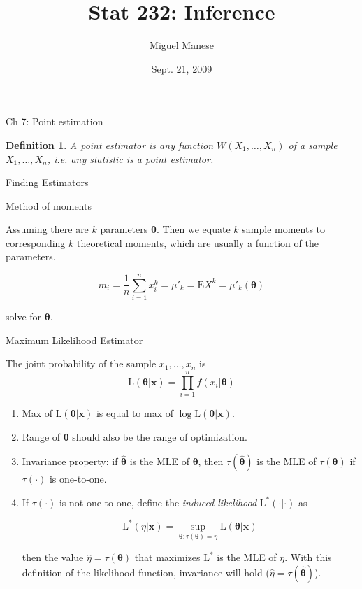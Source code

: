 \documentclass{article}
\title{Stat 232: Inference}
\author{Miguel Manese}
\date{Sept. 21, 2009}
\newcommand{\E}{\mathrm{E}}
\newcommand{\Like}{\mathrm{L}}
\newcommand{\bo}[1]{\boldsymbol{#1}}
\newtheorem{definition}{Definition}
\begin{document}
\maketitle

\begin{section}{Ch 7: Point estimation}
\begin{definition}
A \emph{point estimator} is any function $W(X_{1}, \ldots, X_{n})$ of 
a sample $X_{1}, \ldots, X_{n}$, i.e. any statistic is a point estimator.
\end{definition}

\begin{subsection}{Finding Estimators}
\begin{subsubsection}{Method of moments}

Assuming there are $k$ parameters $\boldsymbol{\theta}$. Then we equate $k$ sample 
moments to corresponding $k$ theoretical moments, which are usually a 
function of the parameters.

\[m_{i} = \frac{1}{n} \sum_{i=1}^{n} x_{i}^{k} = \mu'_{k} = \E X^{k} = 
  \mu'_{k}(\boldsymbol{\theta}) \]

\noindent solve for $\boldsymbol{\theta}$.
\end{subsubsection}

\begin{subsubsection}{Maximum Likelihood Estimator}

The joint probability of the sample $x_{1}, \ldots, x_{n}$ is
\[ \Like(\boldsymbol{\theta} | \boldsymbol{x}) = \prod_{i=1}^{n} 
     f(x_{i}|\boldsymbol{\theta}) \]

\begin{enumerate}
\item Max of $\Like(\bo{\theta}|\bo{x})$ is equal to max of 
  $\log \Like(\bo{\theta}|\bo{x})$.
\item Range of $\bo{\theta}$ should also be the range of optimization.
\item Invariance property: if $\hat{\bo{\theta}}$ is the MLE of $\bo{\theta}$,
then $\tau(\hat{\bo{\theta}})$ is the MLE of $\tau(\bo{\theta})$ if 
$\tau(\cdot)$ is one-to-one.
\item If $\tau(\cdot)$ is not one-to-one, define the \emph{induced likelihood}
$\Like^{*}(\cdot|\cdot)$ as 

\[ \Like^{*}(\eta|\bo{x}) = \sup_{\bo{\theta} : \tau(\bo{\theta}) = \eta}
   \Like(\bo{\theta}|\bo{x}) \]

\noindent then the value $\hat{\eta} = \tau(\bo{\theta})$ that maximizes 
$\Like^{*}$ is the MLE of $\eta$. With this definition of the likelihood
function, invariance will hold ($\hat{\eta} = \tau(\hat{\bo{\theta}})$).


\end{enumerate}
\end{subsubsection}
\end{subsection}
\end{section}
\end{document}
